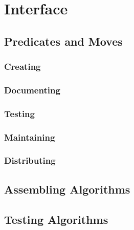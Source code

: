 \section{Interface}
\label{sec:interface-ssa}

\subsection{Predicates and Moves}
\subsubsection{Creating}
\subsubsection{Documenting}
\subsubsection{Testing}
\subsubsection{Maintaining}
\subsubsection{Distributing}
\subsection{Assembling Algorithms}
\subsection{Testing Algorithms}


